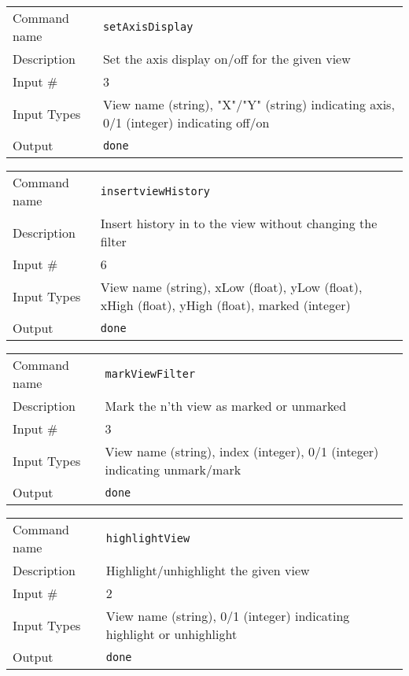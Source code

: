 \bigskip

\noindent
\begin{tabular}{l|p{5in}}
\hline
Command name & {\tt setAxisDisplay} \\
Description  & Set the axis display on/off for the given view \\
Input \#     & 3 \\
Input Types  & View name (string), "X"/"Y" (string) indicating axis,
               0/1 (integer) indicating off/on \\
Output       & {\tt done} \\
\hline
\end{tabular}

\bigskip

\noindent
\begin{tabular}{l|p{5in}}
\hline
Command name & {\tt insertviewHistory} \\
Description  & Insert history in to the view without changing the filter \\
Input \#     & 6 \\
Input Types  & View name (string), xLow (float), yLow (float), xHigh (float),
               yHigh (float), marked (integer) \\
Output       & {\tt done} \\
\hline
\end{tabular}

\bigskip

\noindent
\begin{tabular}{l|p{5in}}
\hline
Command name & {\tt markViewFilter} \\
Description  & Mark the n'th view as marked or unmarked \\
Input \#     & 3 \\
Input Types  & View name (string), index (integer),
               0/1 (integer) indicating unmark/mark \\
Output       & {\tt done} \\
\hline
\end{tabular}

\bigskip

\noindent
\begin{tabular}{l|p{5in}}
\hline
Command name & {\tt highlightView} \\
Description  & Highlight/unhighlight the given view \\
Input \#     & 2 \\
Input Types  & View name (string), 0/1 (integer) indicating highlight
               or unhighlight \\
Output       & {\tt done} \\
\hline
\end{tabular}

